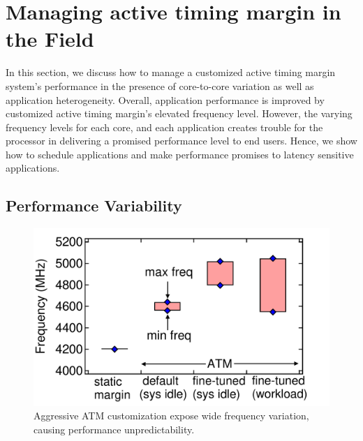 \section{Managing active timing margin in the Field}
\label{sec:process:schedule}


In this section, we discuss how to manage a customized active timing margin system's performance in the presence of core-to-core variation as well as application heterogeneity. Overall, application performance is improved by customized active timing margin's elevated frequency level. However, the varying frequency levels for each core, and each application creates trouble for the processor in delivering a promised performance level to end users. Hence, we show how to schedule applications and make performance promises to latency sensitive applications.



\subsection{Performance Variability}

 \begin{figure}[t]
  \centering
      \includegraphics[trim=0 0 0 0,clip,width=.75\linewidth]{graphs/process/schedule-space.pdf}
      \captionsetup{width=.9\linewidth}
      \caption{Aggressive ATM customization expose wide frequency variation, causing performance unpredictability.}
      \label{fig:schedule-space}
\end{figure}

